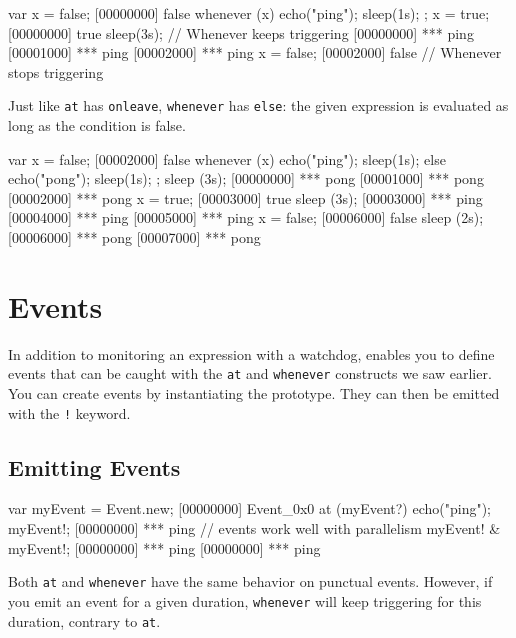 \begin{urbiscript}[firstnumber=1]
var x = false;
[00000000] false
whenever (x)
{
  echo("ping");
  sleep(1s);
};
x = true;
[00000000] true
sleep(3s);
// Whenever keeps triggering
[00000000] *** ping
[00001000] *** ping
[00002000] *** ping
x = false;
[00002000] false
// Whenever stops triggering
\end{urbiscript}

Just like \lstinline|at| has \lstinline|onleave|, \lstinline|whenever|
has \lstinline|else|: the given expression is evaluated as long as the
condition is false.

\begin{urbiscript}[firstnumber=1]
var x = false;
[00002000] false
whenever (x)
{
  echo("ping");
  sleep(1s);
}
else
{
  echo("pong");
  sleep(1s);
};
sleep (3s);
[00000000] *** pong
[00001000] *** pong
[00002000] *** pong
x = true;
[00003000] true
sleep (3s);
[00003000] *** ping
[00004000] *** ping
[00005000] *** ping
x = false;
[00006000] false
sleep (2s);
[00006000] *** pong
[00007000] *** pong
\end{urbiscript}

\section{Events}
\label{sec:tut:events}

In addition to monitoring an expression with a watchdog, \us enables you to
define events that can be caught with the \lstinline|at| and
\lstinline|whenever| constructs we saw earlier. You can create events by
instantiating the  prototype. They can then be emitted with
the \lstinline|!| keyword.

\subsection{Emitting Events}

\begin{urbiscript}[firstnumber=1]
var myEvent = Event.new;
[00000000] Event_0x0
at (myEvent?)
  echo("ping");
myEvent!;
[00000000] *** ping
// events work well with parallelism
myEvent! & myEvent!;
[00000000] *** ping
[00000000] *** ping
\end{urbiscript}

Both \lstinline|at| and \lstinline|whenever| have the same behavior on
punctual events. However, if you emit an event for a given duration,
\lstinline|whenever| will keep triggering for this duration, contrary to
\lstinline|at|.

